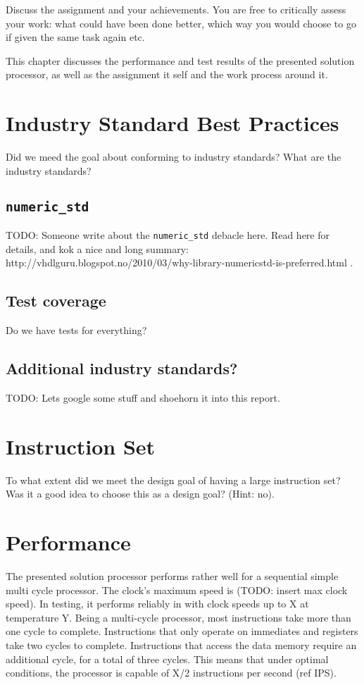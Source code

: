 Discuss the assignment and your achievements.
You are free to critically assess your work:
what could have been done better, which way you would choose to go if given the same task again etc.

This chapter discusses the performance and test results of the presented solution processor, as well as the assignment it self and the work process around it.

\section{Industry Standard Best Practices}

Did we meed the goal about conforming to industry standards?
What are the industry standards?

\subsection{\texttt{numeric\_std}}

TODO: Someone write about the \texttt{numeric\_std} debacle here.
Read here for details, and kok a nice and long summary: http://vhdlguru.blogspot.no/2010/03/why-library-numericstd-is-preferred.html .

\subsection{Test coverage}

Do we have tests for everything?

\subsection{Additional industry standards?}

TODO: Lets google some stuff and shoehorn it into this report.

\section{Instruction Set}

To what extent did we meet the design goal of having a large instruction set?
Was it a good idea to choose this as a design goal? (Hint: no).

\section{Performance}

The presented solution processor performs rather well for a sequential simple multi cycle processor.
The clock's maximum speed is (TODO: insert max clock speed).
In testing, it performs reliably in with clock speeds up to X at temperature Y.
Being a multi-cycle processor, most instructions take more than one cycle to complete.
Instructions that only operate on immediates and registers take two cycles to complete.
Instructions that access the data memory require an additional cycle, for a total of three cycles.
This means that under optimal conditions, the processor is capable of X/2 instructions per second (ref IPS).

